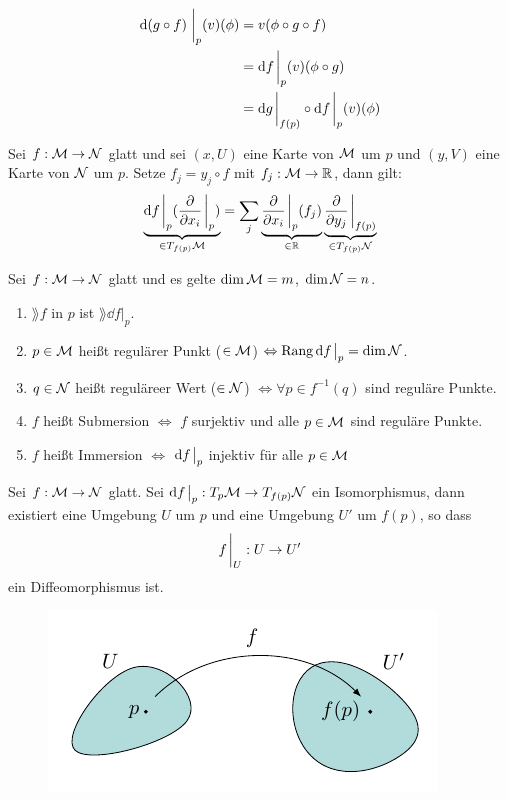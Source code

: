 \begin{bew} \leavevmode
\begin{align*}
\dd (g \circ f) \eval_{p} (v) (\phi) &= v(\phi \circ g \circ f) \\
&= \dd f \eval_p (v)(\phi \circ g) \\
&= \dd g \eval_{f(p)} \circ \dd f \eval_p (v) (\phi)
\end{align*}
\end{bew}

\begin{satz}
Sei $f: \mathcal{M} \to \mathcal{N}$ glatt und sei $(x, U)$ eine Karte von $\mathcal{M}$ um $p$ und $(y, V)$ eine Karte von $\mathcal{N}$ um $p$.
Setze $f_j = y_j \circ f$ mit $f_j : \mathcal{M} \to \mathbb{R}$, dann gilt:
\begin{align}
\underbrace{\dd f \eval_p ( \pdv{x_i} \eval_p)}_{\in T_{f(p)}\mfk} = \sum_j \underbrace{\pdv{x_i}\eval_p (f_j)}_{\in \R} \underbrace{\pdv{y_j} \eval_{f(p)}}_{\in T_{f(p)}\mfka}
\end{align}
\end{satz}

\begin{defs} 
Sei $f: \mathcal{M} \to \mathcal{N}$ glatt und es gelte $\dim\mathcal{M}=m$, $\dim{\mathcal{N}} = n$.
\begin{enumerate}
\item $\rang f$ in $p$ ist $\rang \dd f \big \vert_p $.
\item $p\in\mathcal{M}$ heißt regulärer Punkt ($\in\mathcal{M}$)  $\Leftrightarrow \rang\dd f \eval_p=\dim\mfka$.
\item $q\in\mathcal{N}$ heißt reguläreer Wert ($\in\mathcal{N}$) $\Leftrightarrow \forall p \in f	^{-1}(q)$ sind reguläre Punkte.
\item $f$ heißt Submersion $\Leftrightarrow$ $f$ surjektiv und alle $p\in\mathcal{M}$ sind reguläre Punkte.
\item $f$ heißt Immersion $\Leftrightarrow$ $\dd f \eval_p$ injektiv für alle $p \in \mathcal{M}$
\end{enumerate}
\end{defs}

\begin{satz}[Umkehrsatz]
\label{satz:Umkehrsatz}
Sei $f: \mathcal{M} \to \mathcal{N}$ glatt. 
Sei $\dd f \eval_p : \tspace{p} \to T_{f(p)}\mfka$ ein Isomorphismus,
dann existiert eine Umgebung $U$ um $p$ und eine Umgebung $U'$ um $f(p)$, so dass
\begin{align}
f\eval_U : U \to U'
\end{align}
ein Diffeomorphismus ist.
\begin{figure}[H]
\centering
\includegraphics[width=0.5\linewidth]{figures/tikz/inverse_function_theorem.pdf}
\label{img:umkehrsatz}
\end{figure} 
\end{satz}


